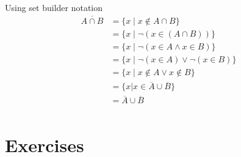 \documentclass[12pt letter]{report}
\begin{document}
{\begin{myproof}
	\end{myproof}
	\noindent Using set builder notation
	\begin{align*}
		\overline{A \cap B} & = \{ x  \mid x \notin A \cap B\} \tag*{Definition of Complement}                                                \\
		                    & = \{x  \mid \neg \left( x \in \left( A \cap B \right)  \right) \} \tag*{Definition of $\notin$}                 \\
		                    & = \{x  \mid \neg \left( x \in A \wedge x \in B \right) \} \tag*{Defintion of Intersection}                      \\
		                    & = \{x  \mid \neg \left( x \in A \right) \vee \neg \left( x \in B \right)  \} \tag*{By First De Morgan's Law for
		propositional logic}                                                                                                                  \\
		                    & = \{x  \mid x \notin A \vee x \notin B\} \tag*{Definition of Complement}                                        \\
		                    & = \{x | x \in \overline{A} \cup \overline{B}\} \tag*{Definition of union}                                       \\
		                    & = \overline{A} \cup \overline{B}                                                                                \\
	\end{align*}
}


\section{Exercises}


\end{document}
